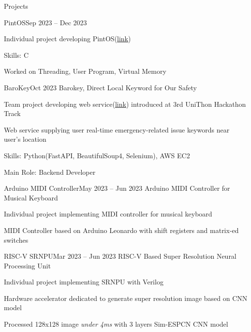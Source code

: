 \documentclass{resume}
\begin{document}
\begin{rSection}{Projects}
\begin{rSubsection}{PintOS}{Sep 2023 -- Dec 2023}
        \item Individual project developing PintOS(\href{https://github.com/minsusun/csed312-pintos}{link})

        \item Skills: C

        \item Worked on Threading, User Program, Virtual Memory
    \end{rSubsection}

    \begin{rSubsection}{BaroKey}{Oct 2023}
        Barokey, Direct Local Keyword for Our Safety

        \item Team project developing web service(\href{https://github.com/UniD3-Hackathon-Team4/barokey}{link}) introduced at 3rd UniThon Hackathon Track

        \item Web service supplying user real-time emergency-related issue keywords near user's location

        \item Skills: Python(FastAPI, BeautifulSoup4, Selenium), AWS EC2

        \item Main Role: Backend Developer
    \end{rSubsection}

    \begin{rSubsection}{Arduino MIDI Controller}{May 2023 -- Jun 2023}
        Arduino MIDI Controller for Musical Keyboard

        \item Individual project implementing MIDI controller for musical keyboard

        \item MIDI Controller based on Arduino Leonardo with shift registers and matrix-ed switches
    \end{rSubsection}

    \begin{rSubsection}{RISC-V SRNPU}{Mar 2023 -- Jun 2023}
        RISC-V Based Super Resolution Neural Processing Unit

        \item Individual project implementing SRNPU with Verilog

        \item Hardware accelerator dedicated to generate super resolution image based on CNN model

        \item Processed 128x128 image \emph{under 4ms} with 3 layers Sim-ESPCN CNN model


\end{rSubsection}
\end{rSection}
\end{document}

